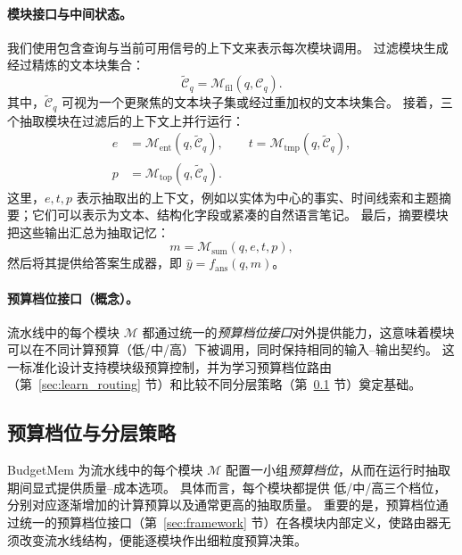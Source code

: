 \paragraph{模块接口与中间状态。}
我们使用包含查询与当前可用信号的上下文来表示每次模块调用。
过滤模块生成经过精炼的文本块集合：
\begin{equation}
\tilde{\mathcal{C}}_q = \mathcal{M}_{\text{fil}}(q, \mathcal{C}_q).
\end{equation}
其中，$\tilde{\mathcal{C}}_q$ 可视为一个更聚焦的文本块子集或经过重加权的文本块集合。
接着，三个抽取模块在过滤后的上下文上并行运行：
\begin{equation}
\begin{aligned}
e &= \mathcal{M}_{\text{ent}}(q, \tilde{\mathcal{C}}_q), \qquad
t = \mathcal{M}_{\text{tmp}}(q, \tilde{\mathcal{C}}_q), \\
p &= \mathcal{M}_{\text{top}}(q, \tilde{\mathcal{C}}_q).
\end{aligned}
\end{equation}
这里，$e,t,p$ 表示抽取出的上下文，例如以实体为中心的事实、时间线索和主题摘要；它们可以表示为文本、结构化字段或紧凑的自然语言笔记。
最后，摘要模块把这些输出汇总为抽取记忆：
\begin{equation}
m = \mathcal{M}_{\text{sum}}(q, e, t, p),
\end{equation}
然后将其提供给答案生成器，即 $\hat{y}=f_{\text{ans}}(q,m)$。

\paragraph{预算档位接口（概念）。}
流水线中的每个模块 $\mathcal{M}$ 都通过统一的\emph{预算档位接口}对外提供能力，这意味着模块可以在不同计算预算（\textsc{低}/\textsc{中}/\textsc{高}）下被调用，同时保持相同的输入--输出契约。
这一标准化设计支持模块级预算控制，并为学习预算档位路由（第~\ref{sec:learn_routing} 节）和比较不同分层策略（第~\ref{sec:budget_tier} 节）奠定基础。

\subsection{预算档位与分层策略}
\label{sec:budget_tier}

BudgetMem 为流水线中的每个模块 $\mathcal{M}$ 配置一小组\emph{预算档位}，从而在运行时抽取期间显式提供质量--成本选项。
具体而言，每个模块都提供 \textsc{低}/\textsc{中}/\textsc{高}三个档位，分别对应逐渐增加的计算预算以及通常更高的抽取质量。
重要的是，预算档位通过统一的预算档位接口（第~\ref{sec:framework} 节）在各模块内部定义，使路由器无须改变流水线结构，便能逐模块作出细粒度预算决策。

